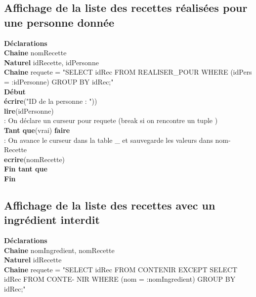 \documentclass[a4paper,10pt]{report}
\begin{document}
\subsection{Affichage de la liste des recettes réalisées pour une personne donnée}

\textbf{Déclarations}\\
	\indent\indent\textbf{Chaine} nomRecette\\
	\indent\indent\textbf{Naturel} idRecette, idPersonne\\	
\indent \indent \textbf{Chaine} requete = "SELECT idRec FROM REALISER\_POUR WHERE (idPers = :idPersonne)
\indent\indent GROUP BY idRec;"\\

\textbf{Début}\\
	\indent\indent \textbf{écrire}("ID de la personne : "))\\
	\indent \indent \textbf{lire}(idPersonne)\\
	\indent\indent {} : On déclare un curseur pour requete (break si on rencontre un tuple )\\
	\indent\indent\textbf{Tant que}(vrai) \textbf{faire}\\
		\indent\indent\indent {} : On avance le curseur dans la table \_ et sauvegarde les valeurs dans nom-
		\indent\indent\indent Recette\\
	\indent\indent \indent \textbf{ecrire}(nomRecette)\\
	\indent\indent\textbf{Fin tant que}\\	
\indent\textbf{Fin}\\	




\subsection{Affichage de la liste des recettes avec un ingrédient interdit}
\textbf{Déclarations}\\
	\indent\indent\textbf{Chaine} nomIngredient, nomRecette\\
	\indent\indent\textbf{Naturel} idRecette\\	
\indent \indent \textbf{Chaine} requete = "SELECT idRec FROM CONTENIR EXCEPT SELECT idRec FROM CONTE-
\indent\indent NIR WHERE (nom = :nomIngredient) GROUP BY idRec;"\\
\end{document}
